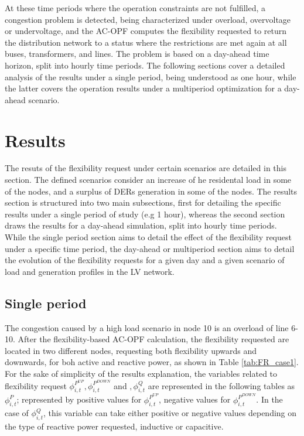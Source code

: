 At these time periods where the operation constraints are not fulfilled, a congestion problem is detected, being characterized under overload, overvoltage or undervoltage, and the AC-OPF computes the flexibility requested to return the distribution network to a status where the restrictions are met again at all buses, transformers, and lines. The problem is based on a day-ahead time horizon, split into hourly time periods. The following sections cover a detailed analysis of the results under a single period, being understood as one hour, while the latter covers the operation results under a multiperiod optimization for a day-ahead scenario.  

\newpage
\section{Results}
The resuts of the flexibility request under certain scenarios are detailed in this section. The defined scenarios consider an increase of he residental load in some of the nodes, and a surplus of DERs generation in some of the nodes. The results section is structured into two main subsections, first for detailing the specific results under a single period of study (e.g 1 hour), whereas the second section draws the results for a day-ahead simulation, split into hourly time periods. While the single period section aims to detail the effect of the flexibility request under a specific time period, the day-ahead or multiperiod section aims to detail the evolution of the flexibility requests for a given day and a given scenario of load and generation profiles in the LV network. 
\subsection{Single period}
The congestion caused by a high load scenario in node 10 is an overload of line 6-10. After the flexibility-based AC-OPF calculation, the flexibility requested are located in two different nodes, requesting both flexibility upwards and downwards, for boh active and reactive power, as shown in Table \ref{tab:FR_case1}. For the sake of simplicity of the results explanation, the variables related to flexibility request $\phi_{i,t}^{P^{UP}},\phi_{i,t}^{P^{DOWN}}$ and $,\phi_{i,t}^{Q}$ are represented in the following tables as $\phi_{i,t}^{P}$; represented by positive values for $\phi_{i,t}^{P^{UP}}$, negative values for $\phi_{i,t}^{P^{DOWN}}$. In the case of $\phi_{i,t}^{Q}$, this variable can take either positive or negative values depending on the type of reactive power requested, inductive or capacitive. 


